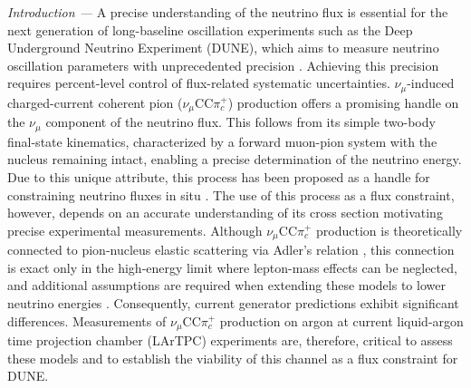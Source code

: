 \documentclass[aps,prl,reprint,superscriptaddress,nofootinbib, showpacs]{revtex4-2}
\begin{document}
\begin{abstract}
We report a measurement of the charged-current coherent pion production cross section on argon using the MicroBooNE liquid argon time projection chamber exposed to the Booster Neutrino Beam at Fermilab. The measurement uses the MicroBooNE data set corresponding to $1.26 \times 10^{21}$ protons on target with a mean neutrino energy of $0.8$~GeV. The flux-averaged cross section is measured to be $(9.1 \pm 1.2_{\text{stat}} \pm 1.2_\text{syst}) \times 10^{-40}\,\text{cm}^2/\text{Ar}$. This result represents the first measurement of charged-current coherent pion production on argon at sub-GeV neutrino energies. Due to its clean two-body kinematics, where the neutrino interacts coherently with the entire nucleus producing a forward muon and pion with no nuclear breakup, this process provides a useful tool for constraining neutrino flux uncertainties in current and future oscillation experiments such as DUNE.
\end{abstract}

\maketitle



\textit{Introduction ---} A precise understanding of the neutrino flux is essential for the next generation of long-baseline oscillation experiments such as the Deep Underground Neutrino Experiment (DUNE), which aims to measure neutrino oscillation parameters with unprecedented precision \cite{Abi2020DUNE}. Achieving this precision requires percent-level control of flux-related systematic uncertainties. $\nu_\mu$-induced charged-current coherent pion ($\nu_\mu$CC$\pi^+_c$) production offers a promising handle on the $\nu_\mu$ component of the neutrino flux. This follows from its simple two-body final-state kinematics, characterized by a forward muon-pion system with the nucleus remaining intact, enabling a precise determination of the neutrino energy. Due to this unique attribute, this process has been proposed as a handle for constraining neutrino fluxes in situ \cite{Jung2025}. The use of this process as a flux constraint, however, depends on an accurate understanding of its cross section motivating precise experimental measurements. Although $\nu_\mu$CC$\pi^+_c$ production is theoretically connected to pion-nucleus elastic scattering via Adler’s relation \cite{Adler}, this connection is exact only in the high-energy limit where lepton-mass effects can be neglected, and additional assumptions are required when extending these models to lower neutrino energies \cite{PhysRevD.79.013002}. Consequently, current generator predictions exhibit significant differences. Measurements of $\nu_\mu$CC$\pi^+_c$ production on argon at current liquid-argon time projection chamber (LArTPC) experiments are, therefore, critical to assess these models and to establish the viability of this channel as a flux constraint for DUNE. 
\end{document}

